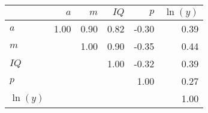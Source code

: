 \begin{tabular}{lrrrrr}
\hline
 & $a$  & $m$  & $IQ$  & $p$  & $\ln(y)$  \\
\hline
$a$ & 1.00  & 0.90  & 0.82  & -0.30  & 0.39  \\
$m$ &   & 1.00  & 0.90  & -0.35  & 0.44  \\
$IQ$ &   &   & 1.00  & -0.32  & 0.39  \\
$p$ &   &   &   & 1.00  & 0.27  \\
$\ln(y)$ &   &   &   &   & 1.00  \\
\hline
\end{tabular}%
